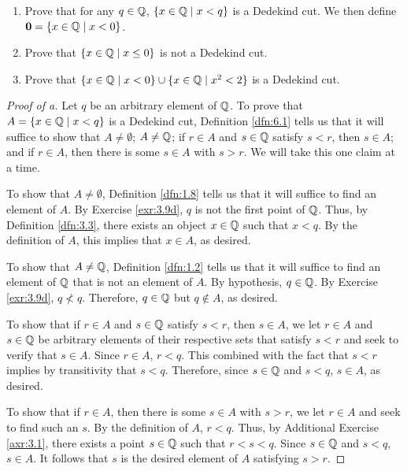\documentclass[../main.tex]{subfiles}
\begin{document}
\begin{exercise}\label{exr:6.3}\leavevmode
    \begin{enumerate}[label={(\alph*)},ref={\thetheorem\alph*}]
        \item \label{exr:6.3a}Prove that for any $q\in\mathbb{Q}$, $\{x\in\mathbb{Q}\mid x<q\}$ is a Dedekind cut. We then define $\bm{0}=\{x\in\mathbb{Q}\mid x<0\}$.
        \item \label{exr:6.3b}Prove that $\{x\in\mathbb{Q}\mid x\leq 0\}$ is not a Dedekind cut.
        \item \label{exr:6.3c}Prove that $\{x\in\mathbb{Q}\mid x<0\}\cup\{x\in\mathbb{Q}\mid x^2<2\}$ is a Dedekind cut.
    \end{enumerate}
    \begin{proof}[Proof of a]
        Let $q$ be an arbitrary element of $\mathbb{Q}$. To prove that $A=\{x\in\mathbb{Q}\mid x<q\}$ is a Dedekind cut, Definition \ref{dfn:6.1} tells us that it will suffice to show that $A\neq\emptyset$; $A\neq\mathbb{Q}$; if $r\in A$ and $s\in\mathbb{Q}$ satisfy $s<r$, then $s\in A$; and if $r\in A$, then there is some $s\in A$ with $s>r$. We will take this one claim at a time.\par
        To show that $A\neq\emptyset$, Definition \ref{dfn:1.8} tells us that it will suffice to find an element of $A$. By Exercise \ref{exr:3.9d}, $q$ is not the first point of $\mathbb{Q}$. Thus, by Definition \ref{dfn:3.3}, there exists an object $x\in\mathbb{Q}$ such that $x<q$. By the definition of $A$, this implies that $x\in A$, as desired.\par
        To show that $A\neq\mathbb{Q}$, Definition \ref{dfn:1.2} tells us that it will suffice to find an element of $\mathbb{Q}$ that is not an element of $A$. By hypothesis, $q\in\mathbb{Q}$. By Exercise \ref{exr:3.9d}, $q\not<q$. Therefore, $q\in\mathbb{Q}$ but $q\notin A$, as desired.\par
        To show that if $r\in A$ and $s\in\mathbb{Q}$ satisfy $s<r$, then $s\in A$, we let $r\in A$ and $s\in\mathbb{Q}$ be arbitrary elements of their respective sets that satisfy $s<r$ and seek to verify that $s\in A$. Since $r\in A$, $r<q$. This combined with the fact that $s<r$ implies by transitivity that $s<q$. Therefore, since $s\in\mathbb{Q}$ and $s<q$, $s\in A$, as desired.\par
        To show that if $r\in A$, then there is some $s\in A$ with $s>r$, we let $r\in A$ and seek to find such an $s$. By the definition of $A$, $r<q$. Thus, by Additional Exercise \ref{axr:3.1}, there exists a point $s\in\mathbb{Q}$ such that $r<s<q$. Since $s\in\mathbb{Q}$ and $s<q$, $s\in A$. It follows that $s$ is the desired element of $A$ satisfying $s>r$.

\end{proof}
\end{exercise}
\end{document}
